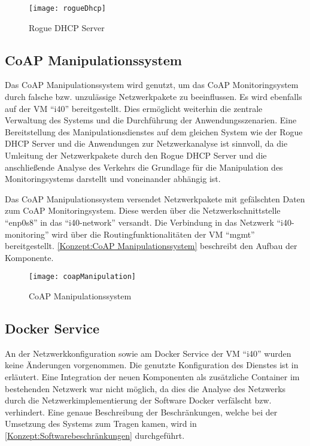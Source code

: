 \begin{figure}[h]
  \centering
  \texttt{[image: rogueDhcp]}
  \caption{Rogue DHCP Server} 
  \label{Konzept:Rogue DHCP Server}
\end{figure}

\subsection{\ac{CoAP} Manipulationssystem}
Das \ac{CoAP} Manipulationssystem wird genutzt, um das \ac{CoAP} Monitoringsystem durch falsche bzw. unzulässige Netzwerkpakete zu beeinflussen. Es wird ebenfalls auf der \ac{VM} "`i40"' bereitgestellt. Dies ermöglicht weiterhin die zentrale Verwaltung des Systems und die Durchführung der Anwendungsszenarien. Eine Bereitstellung des Manipulationsdienstes auf dem gleichen System wie der Rogue \ac{DHCP} Server und die Anwendungen zur Netzwerkanalyse ist sinnvoll, da die Umleitung der Netzwerkpakete durch den Rogue \ac{DHCP} Server und die anschließende Analyse des Verkehrs die Grundlage für die Manipulation des Monitoringsystems darstellt und voneinander abhängig ist.

Das \ac{CoAP} Manipulationssystem versendet Netzwerkpakete mit gefälschten Daten zum \ac{CoAP} Monitoringsystem. Diese werden über die Netzwerkschnittstelle "`enp0s8"' in das "`i40-network"' versandt. Die Verbindung in das Netzwerk "`i40-monitoring"' wird über die Routingfunktionalitäten der \ac{VM} "`mgmt"' bereitgestellt. \autoref{Konzept:CoAP Manipulationssystem} beschreibt den Aufbau der Komponente.

\begin{figure}[h]
  \centering
  \texttt{[image: coapManipulation]}
  \caption{CoAP Manipulationssystem} 
  \label{Konzept:CoAP Manipulationssystem}
\end{figure}

\subsection{Docker Service}
An der Netzwerkkonfiguration sowie am Docker Service der \ac{VM} "`i40"' wurden keine Änderungen vorgenommen. Die genutzte Konfiguration des Dienstes ist in \cite{Weber2018} erläutert. Eine Integration der neuen Komponenten als zusätzliche Container im bestehenden Netzwerk war nicht möglich, da dies die Analyse des Netzwerks durch die Netzwerkimplementierung der Software Docker verfälscht bzw. verhindert. Eine genaue Beschreibung der Beschränkungen, welche bei der Umsetzung des Systems zum Tragen kamen, wird in \autoref{Konzept:Softwarebeschränkungen} durchgeführt.

